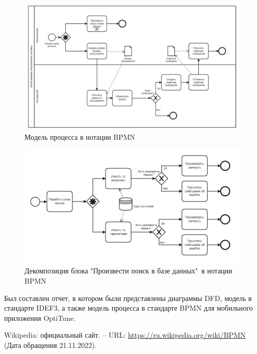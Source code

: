 \documentclass[14pt]{extreport}
\begin{document}
\begin{landscape}
\begin{figure}[H]
\centerline{\includegraphics[width=0.9\linewidth]{1}}
\caption{Модель процесса в нотации BPMN}
\label{fig9}
\end{figure}

\begin{figure}[H]
\centerline{\includegraphics[width=0.9\linewidth]{2}}
\caption{Декомпозиция блока "Произвести поиск в базе данных"\ в нотации BPMN}
\label{fig10}
\end{figure}
\end{landscape}

\conclusions

Был составлен отчет, в котором были представлены диаграммы DFD, модель в стандарте IDEF3, а также модель процесса в стандарте BPMN для мобильного приложения OptiTune.


\newpage
\begin{thebibliography}{99}

 Wikipedia: официальный сайт. – URL: \url{https://ru.wikipedia.org/wiki/BPMN} (Дата обращения 21.11.2022).

\end{thebibliography}
\end{document}
